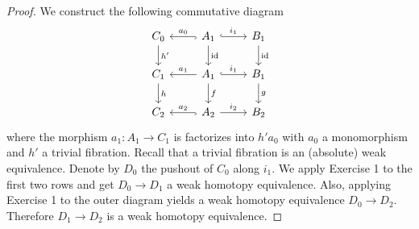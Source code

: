 \documentclass[a4paper,11pt,openany]{scrartcl}
\begin{document}
~\\
\begin{proof}
We construct the following commutative diagram
\[
\begin{tikzcd}
C_0\arrow[d,"h'"]& A_1\arrow[r,hookrightarrow,"i_1"]\arrow[d,"\id"]\arrow[l,hookrightarrow,"a_0"']& B_1\arrow[d,"\id"]\\
C_1\arrow[d,"h"]& A_1\arrow[r,hookrightarrow,"i_1"]\arrow[d,"f"]\arrow[l,"a_1"']& B_1\arrow[d,"g"]\\
C_2& A_2\arrow[r,"i_2"]\arrow[l,hookrightarrow,"a_2"']& B_2
\end{tikzcd}
\]
where the morphism $a_1\colon A_1\to C_1$ is factorizes into $h'a_0$ with $a_0$ a monomorphism and $h'$ a trivial fibration. Recall that a trivial fibration is an (absolute) weak equivalence. Denote by $D_0$ the pushout of $C_0$ along $i_1$. We apply Exercise 1 to the first two rows and get $D_0\to D_1$ a weak homotopy equivalence. Also, applying Exercise 1 to the outer diagram yields a weak homotopy equivalence $D_0\to D_2$. Therefore $D_1\to D_2$ is a weak homotopy equivalence.
\end{proof}
\newpage
\end{document}
